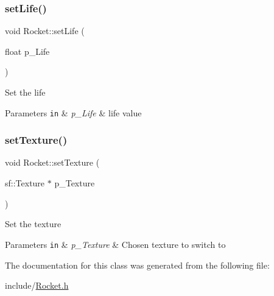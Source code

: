 \subsubsection{\texorpdfstring{set\+Life()}{setLife()}}
{\footnotesize\ttfamily void Rocket\+::set\+Life (\begin{DoxyParamCaption}\item[{float}]{p\+\_\+\+Life }\end{DoxyParamCaption})}

Set the life 
\begin{DoxyParams}[1]{Parameters}
\mbox{\tt in}  & {\em p\+\_\+\+Life} & life value \\
\hline
\end{DoxyParams}
\mbox{\label{class_rocket_a3ecac400b4edb82d8288be25f9a0b949}} 
\subsubsection{\texorpdfstring{set\+Texture()}{setTexture()}}
{\footnotesize\ttfamily void Rocket\+::set\+Texture (\begin{DoxyParamCaption}\item[{sf\+::\+Texture $\ast$}]{p\+\_\+\+Texture }\end{DoxyParamCaption})}

Set the texture 
\begin{DoxyParams}[1]{Parameters}
\mbox{\tt in}  & {\em p\+\_\+\+Texture} & Chosen texture to switch to \\
\hline
\end{DoxyParams}


The documentation for this class was generated from the following file\+:\begin{DoxyCompactItemize}
\item 
include/\hyperlink{_rocket_8h}{Rocket.\+h}\end{DoxyCompactItemize}
